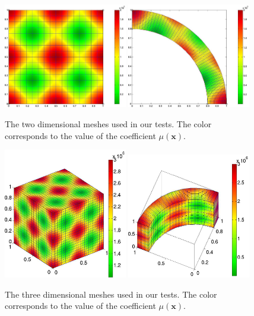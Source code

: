 \documentclass[smallcondensed,final]{svjour3}     %
\newcommand{\bs}[1]{\ensuremath{\boldsymbol #1}}
\begin{document}
\begin{figure}
	\includegraphics[width=0.48\textwidth]{figs/box}
	\includegraphics[width=0.48\textwidth]{figs/fan}
	\caption{\label{fig:mesh2d} The two dimensional meshes used in
          our tests. The color corresponds to the value of the
          coefficient $\mu(\bs x)$.}
\end{figure}
\begin{figure}
	\includegraphics[width=0.48\textwidth]{figs/box3a}
	\includegraphics[width=0.48\textwidth]{figs/fan3a}
	\caption{\label{fig:mesh3d} The three dimensional meshes used
          in our tests. The color corresponds to the value of the
          coefficient $\mu(\bs x)$.}
\end{figure}
\end{document}
